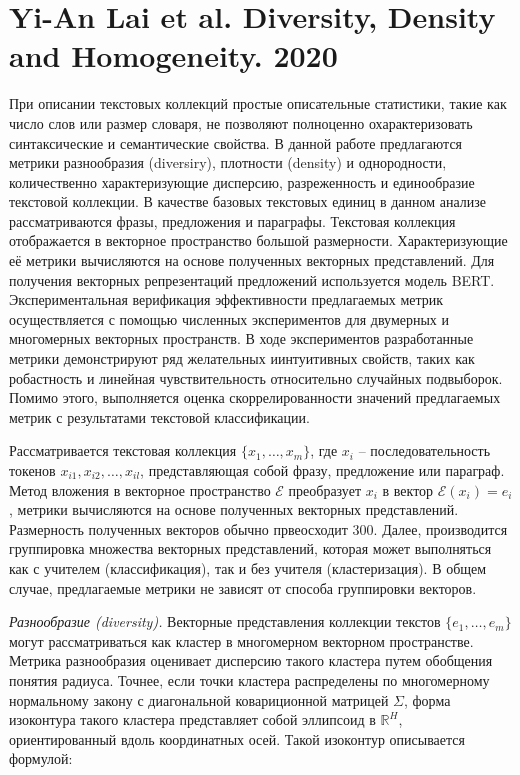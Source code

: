 \section{Yi-An Lai et al. Diversity, Density and Homogeneity. 2020}

При описании текстовых коллекций простые описательные статистики, такие как число слов или размер словаря, не позволяют полноценно охарактеризовать синтаксические и семантические свойства. В данной работе предлагаются метрики разнообразия (diversiry), плотности (density) и однородности, количественно характеризующие дисперсию, разреженность и единообразие текстовой коллекции. В качестве базовых текстовых единиц в данном анализе рассматриваются фразы, предложения и параграфы. Текстовая коллекция отображается в векторное пространство большой размерности. Характеризующие её метрики вычисляются на основе полученных векторных представлений. Для получения векторных репрезентаций предложений используется модель BERT. Экспериментальная верификация эффективности предлагаемых метрик осуществляется с помощью численных экспериментов для двумерных и многомерных векторных пространств. В ходе экспериментов разработанные метрики демонстрируют ряд желательных иинтуитивных свойств, таких как робастность и линейная чувствительность относительно случайных подвыборок. Помимо этого, выполняется оценка скоррелированности значений предлагаемых метрик с результатами текстовой классификации.

Рассматривается текстовая коллекция $\{x_1, \ldots, x_m\}$, где $x_i$ -- последовательность токенов $x_{i1}, x_{i2}, \ldots, x_{il}$, представляющая собой фразу, предложение или параграф. Метод вложения в векторное пространство $\mathcal{E}$ преобразует $x_i$ в вектор $\mathcal{E}(x_i) = e_i$, метрики вычисляются на основе полученных векторных представлений. Размерность полученных векторов обычно првеосходит 300. Далее, производится группировка множества векторных представлений, которая может выполняться как с учителем (классификация), так и без учителя (кластеризация). В общем случае, предлагаемые метрики не зависят от способа группировки векторов.

\textit{Разнообразие (diversity).} Векторные представления коллекции текстов $\{e_1, \ldots, e_m\}$ могут рассматриваться как кластер в многомерном векторном пространстве. Метрика разнообразия оценивает дисперсию такого кластера путем обобщения понятия радиуса. Точнее, если точки кластера распределены по многомерному нормальному закону с диагональной ковариционной матрицей $\Sigma$, форма изоконтура такого кластера представляет собой эллипсоид в $\mathbb{R}^H$, ориентированный вдоль координатных осей. Такой изоконтур описывается формулой:

